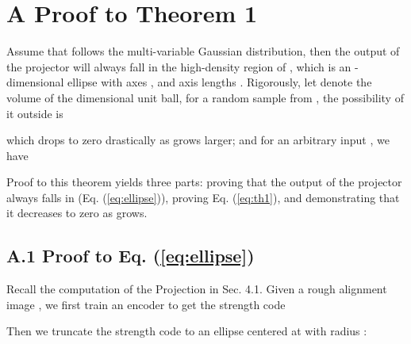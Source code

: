 \documentclass[10pt,twocolumn,letterpaper]{article}
\begin{document}
{\small


}


\newcommand{\beginsupplementary}{\setcounter{equation}{0}
        \renewcommand{\theequation}{S\arabic{equation}}\setcounter{table}{0}
        \renewcommand{\thetable}{S\arabic{table}}\setcounter{figure}{0}
        \renewcommand{\thefigure}{S\arabic{figure}}}
     
\renewcommand{\contentsname}{\centering Appendix}








\appendix
\beginsupplementary


\onecolumn

\section*{A Proof to Theorem 1}

\begin{theorem}
Assume that  follows the multi-variable Gaussian distribution, then the output of the projector  will always fall in the high-density region of , which is an -dimensional ellipse  with axes , and axis lengths . Rigorously, let  denote the volume of the  dimensional unit ball, for a random sample  from , the possibility of it outside  is

which drops to zero drastically as  grows larger; and for an arbitrary input , we have

\end{theorem}
\newtheorem{remark}{Remark}




Proof to this theorem yields three parts: proving that the output of the projector  always falls in  (Eq. (\ref{eq:ellipse})), proving Eq. (\ref{eq:th1}), and demonstrating that it decreases to zero as  grows.

\subsection*{A.1 Proof to Eq. (\ref{eq:ellipse})}
Recall the computation of the Projection in Sec. 4.1. Given a rough alignment image , we first train an encoder  to get the strength code 

Then we truncate the strength code  to an ellipse centered at  with radius :
\end{document}
